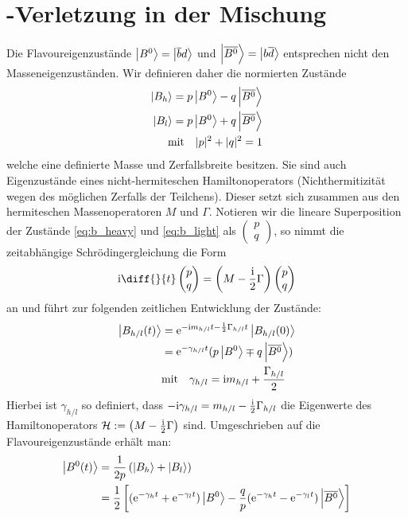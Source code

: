 \section{\CP-Verletzung in der Mischung}
Die Flavoureigenzustände $\Ket{B^0} = \Ket{\overline{b}d}$ und $\Ket{\overline{B^0}} = \Ket{b\overline{d}}$ entsprechen nicht den Masseneigenzuständen. Wir definieren daher die normierten Zustände
\begin{align}
\Ket{B_h} = p \Ket{B^0} - q \Ket{\overline{B^0}} \label{eq:b_heavy}\\ 
\Ket{B_l} = p \Ket{B^0} + q \Ket{\overline{B^0}} \label{eq:b_light}\\
\text{mit} \quad |p|^2 + |q|^2 = 1
\end{align}
welche eine definierte Masse und Zerfallsbreite besitzen. Sie sind auch Eigenzustände eines nicht-hermiteschen Hamiltonoperators (Nichthermitizität wegen des möglichen Zerfalls der Teilchens). Dieser setzt sich zusammen aus den hermiteschen Massenoperatoren $M$ und $\Gamma$. Notieren wir die lineare Superposition der Zustände \ref{eq:b_heavy} und \ref{eq:b_light} als $\begin{pmatrix} p \\ q \end{pmatrix}$, so nimmt die zeitabhängige Schrödingergleichung die Form
\begin{align}
\im \diff{}{t}\begin{pmatrix} p \\ q \end{pmatrix} = \left(M - \frac{\im}{2} \Gamma\right) \begin{pmatrix} p \\ q \end{pmatrix}
\end{align}
an und führt zur folgenden zeitlichen Entwicklung der Zustände:
\begin{align}
\nonumber \Ket{B_{h/l}(t)} &= \mathrm{e}^{-\mathrm{i} m_{h/l}t-\frac{1}{2}\Gamma_{h/l}t}\Ket{B_{h/l}(0)} \\
                           &= \mathrm{e}^{-\gamma_{h/l}t}(p\Ket{B^0} \mp q\Ket{\overline{B^0}}) \\
&\text{mit} \quad \gamma_{h/l} = \mathrm{i} m_{h/l}+\frac{\Gamma_{h/l}}{2}
\end{align}
Hierbei ist $\gamma_{h/l}$ so definiert, dass $-\mathrm{i}\gamma_{h/l} = m_{h/l}-\frac{\mathrm{i}}{2}\Gamma_{h/l}$ die Eigenwerte des Hamiltonoperators $\mathcal{H} := \left(M - \frac{\mathrm{i}}{2} \Gamma\right)$ sind. Umgeschrieben auf die Flavoureigenzustände erhält man:
\begin{align}
\nonumber \Ket{B^0(t)} &= \frac{1}{2p}\left(\Ket{B_h} + \Ket{B_l}\right) \\
                       &= \frac{1}{2}\left[ (\mathrm{e}^{-\gamma_h t}+\mathrm{e}^{-\gamma_l t})\Ket{B^0} - \frac{q}{p}(\mathrm{e}^{-\gamma_h t}-\mathrm{e}^{-\gamma_l t})\Ket{\overline{B^0}}\right] \label{eg:b(t)}
\end{align}
